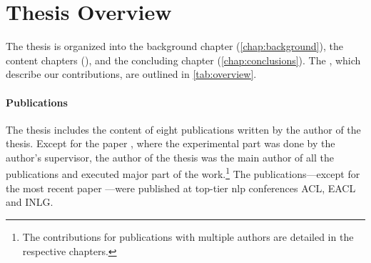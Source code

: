 \section{Thesis Overview}
\label{sec:overview}

The thesis is organized into the background chapter (\autoref{chap:background}), the content chapters (), and the concluding chapter (\autoref{chap:conclusions}). The , which describe our contributions, are outlined in \autoref{tab:overview}.

\paragraph{Publications} The thesis includes the content of eight publications written by the author of the thesis. Except for the paper \citet{dusekEvaluatingSemanticAccuracy2020}, where the experimental part was done by the author's supervisor, the author of the thesis was the main author of all the publications and executed major part of the work.\footnote{The contributions for publications with multiple authors are detailed in the respective chapters.} The publications---except for the most recent paper \citet{kasnerReferenceBasedMetricsAnalyzing2024}---were published at top-tier \ac{nlp} conferences ACL, EACL and INLG.

